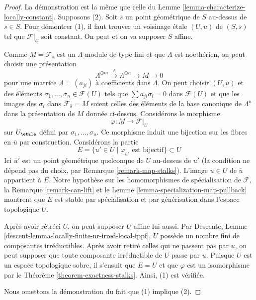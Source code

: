 \begin{proof}
La démonstration est la même que celle du
Lemme \ref{lemma-characterize-locally-constant}.
Supposons (2). Soit $\overline{s}$ un point géométrique de $S$ au-dessus de
$s \in S$. Pour démontrer (1), il faut trouver un voisinage étale
$(U, \overline{u})$ de $(S, \overline{s})$ tel que $\mathcal{F}|_U$
soit constant. On peut et on va supposer $S$ affine.

\medskip\noindent
Comme $M = \mathcal{F}_{\overline{s}}$ est un $\Lambda$-module de type fini
et que $\Lambda$ est noethérien, on peut choisir une présentation
$$
\Lambda^{\oplus m} \xrightarrow{A} \Lambda^{\oplus n} \to M \to 0
$$
pour une matrice $A = (a_{ji})$ à coefficients dans $\Lambda$.
On peut choisir $(U, \overline{u})$ et des éléments
$\sigma_1, \ldots, \sigma_n \in \mathcal{F}(U)$
tels que $\sum a_{ji}\sigma_i = 0$ dans $\mathcal{F}(U)$ et
que les images des $\sigma_i$ dans $\mathcal{F}_{\overline{s}} = M$
soient celles des éléments de la base canonique de
$\Lambda^n$ dans la présentation de $M$ donnée ci-dessus.
Considérons le morphisme
$$
\varphi : \underline{M} \longrightarrow \mathcal{F}|_U
$$
sur $U_\etale$ défini par $\sigma_1, \ldots, \sigma_n$.
Ce morphisme induit une bijection sur les fibres en $\overline{u}$
par construction. Considérons la partie
$$
E = \{u' \in U \mid \varphi_{\overline{u}'}\text{ est bijectif}\} \subset U
$$
Ici $\overline{u}'$ est un point géométrique quelconque de $U$ au-dessus de $u'$
(la condition ne dépend pas du choix, par Remarque \ref{remark-map-stalks}).
L'image $u \in U$ de $\overline{u}$ appartient à $E$.
Notre hypothèse sur les homomorphismes de spécialisation de $\mathcal{F}$,
la Remarque \ref{remark-can-lift} et le
Lemme \ref{lemma-specialization-map-pullback}
montrent que $E$ est stable par spécialisation
et par générisation dans l'espace topologique $U$.

\medskip\noindent
Après avoir rétréci $U$, on peut supposer $U$ affine lui aussi. Par
Descente, Lemme \ref{descent-lemma-locally-finite-nr-irred-local-fppf},
$U$ possède un nombre fini de composantes irréductibles.
Après avoir retiré celles qui ne passent pas
par $u$, on peut supposer que toute composante irréductible de $U$
passe par $u$. Puisque $U$ est un espace topologique sobre,
il s'ensuit que $E = U$ et que $\varphi$ est un isomorphisme par le
Théorème \ref{theorem-exactness-stalks}. Ainsi, (1) est vérifiée.

\medskip\noindent
Nous omettons la démonstration du fait que (1) implique (2).
\end{proof}

